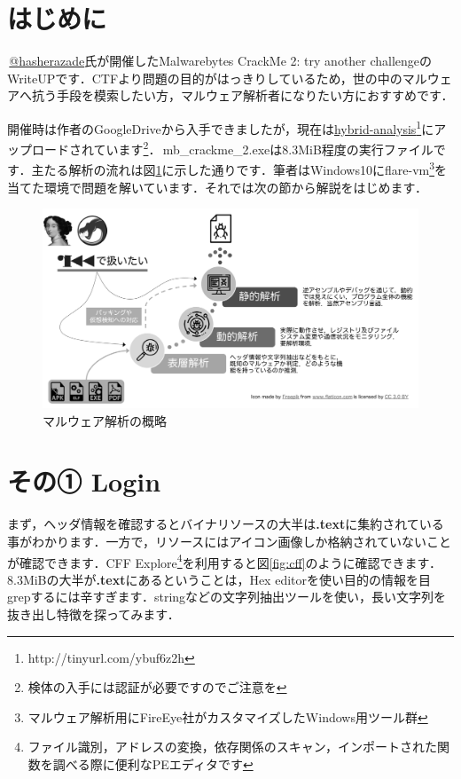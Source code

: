 \small
\section{はじめに}
\faTwitterSquare \,\href{https://twitter.com/hasherezade}{@hasherazade}氏が開催したMalwarebytes CrackMe 2: try another challengeのWriteUPです．CTFより問題の目的がはっきりしているため，世の中のマルウェアへ抗う手段を模索したい方，マルウェア解析者になりたい方におすすめです．

開催時は作者のGoogleDriveから入手できましたが，現在は\href{http://tinyurl.com/ybuf6z2h}{hybrid-analysis}\footnote{http://tinyurl.com/ybuf6z2h}にアップロードされています\footnote{検体の入手には認証が必要ですのでご注意を}．\faFileCodeO \,mb\_crackme\_2.exeは8.3MiB程度の実行ファイルです．主たる解析の流れは図\ref{fig:malware_analysis}に示した通りです．筆者はWindows10にflare-vm\footnote{マルウェア解析用にFireEye社がカスタマイズしたWindows用ツール群}を当てた環境で問題を解いています．それでは次の節から解説をはじめます．
\begin{figure}[H]
    \centering
    \includegraphics[width=0.85\linewidth]{./assets/takuzoo3868asset/flow_gray.png}
    \caption{マルウェア解析の概略}
    \label{fig:malware_analysis}
\end{figure}

\section{その① Login}
まず，ヘッダ情報を確認するとバイナリソースの大半は\textbf{.text}に集約されている事がわかります．一方で，リソースにはアイコン画像しか格納されていないことが確認できます．CFF Explore\footnote{ファイル識別，アドレスの変換，依存関係のスキャン，インポートされた関数を調べる際に便利なPEエディタです}を利用すると図\ref{fig:cff}のように確認できます．8.3MiBの大半が\textbf{.text}にあるということは，Hex editorを使い目的の情報を目grepするには辛すぎます．stringなどの文字列抽出ツールを使い，長い文字列を抜き出し特徴を探ってみます．

